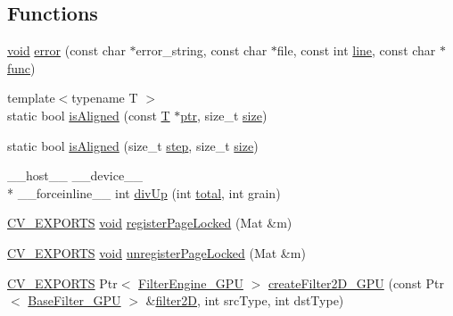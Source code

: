 \subsection*{Functions}
\begin{DoxyCompactItemize}
\item 
\hyperlink{legacy_8hpp_a8bb47f092d473522721002c86c13b94e}{void} \hyperlink{namespacecv_1_1gpu_a6fe205f2a3e57d7f6f2c4d7c07002405}{error} (const char $\ast$error\-\_\-string, const char $\ast$file, const int \hyperlink{legacy_8hpp_a5a869825573cfaf8861a6ec0fe0f262f}{line}, const char $\ast$\hyperlink{core__c_8h_a120677ac732b3c9bfecab149fc978afa}{func})
\item 
{\footnotesize template$<$typename T $>$ }\\static bool \hyperlink{namespacecv_1_1gpu_aa554e59e09e2e3a8f891b5b0a521b5ba}{is\-Aligned} (const \hyperlink{calib3d_8hpp_a3efb9551a871ddd0463079a808916717}{T} $\ast$\hyperlink{core__c_8h_a166529da793cc1ef241cff347f3db5a5}{ptr}, size\-\_\-t \hyperlink{legacy_8hpp_ae97003f8d5c64cdfb99f6f2606d121b6}{size})
\item 
static bool \hyperlink{namespacecv_1_1gpu_a6748cc1886c9b97dc92ff5059fa202e7}{is\-Aligned} (size\-\_\-t \hyperlink{legacy_8hpp_abc16e65f240ed0c8f3e876e8732c0a33}{step}, size\-\_\-t \hyperlink{legacy_8hpp_ae97003f8d5c64cdfb99f6f2606d121b6}{size})
\item 
\-\_\-\-\_\-host\-\_\-\-\_\- \-\_\-\-\_\-device\-\_\-\-\_\- \\*
\-\_\-\-\_\-forceinline\-\_\-\-\_\- int \hyperlink{namespacecv_1_1gpu_a7b80d0ece4df0b1f517b22422a3d272f}{div\-Up} (int \hyperlink{core__c_8h_a1d3d6f26038d24a66062d29e890a4301}{total}, int grain)
\item 
\hyperlink{core_2types__c_8h_a1bf9f0e121b54272da02379cfccd0a2b}{C\-V\-\_\-\-E\-X\-P\-O\-R\-T\-S} \hyperlink{legacy_8hpp_a8bb47f092d473522721002c86c13b94e}{void} \hyperlink{namespacecv_1_1gpu_a558eb0470ed87c78f8a0110b863c61a0}{register\-Page\-Locked} (Mat \&m)
\item 
\hyperlink{core_2types__c_8h_a1bf9f0e121b54272da02379cfccd0a2b}{C\-V\-\_\-\-E\-X\-P\-O\-R\-T\-S} \hyperlink{legacy_8hpp_a8bb47f092d473522721002c86c13b94e}{void} \hyperlink{namespacecv_1_1gpu_aa55a2e1497f0854b4a063f4a272055df}{unregister\-Page\-Locked} (Mat \&m)
\item 
\hyperlink{core_2types__c_8h_a1bf9f0e121b54272da02379cfccd0a2b}{C\-V\-\_\-\-E\-X\-P\-O\-R\-T\-S} Ptr$<$ \hyperlink{classcv_1_1gpu_1_1FilterEngine__GPU}{Filter\-Engine\-\_\-\-G\-P\-U} $>$ \hyperlink{namespacecv_1_1gpu_a69ab6da5fc06f6d80ce577ac5222837e}{create\-Filter2\-D\-\_\-\-G\-P\-U} (const Ptr$<$ \hyperlink{classcv_1_1gpu_1_1BaseFilter__GPU}{Base\-Filter\-\_\-\-G\-P\-U} $>$ \&\hyperlink{namespacecv_1_1gpu_ad0dd9de5d0cfcd09316f6377d356e689}{filter2\-D}, int src\-Type, int dst\-Type)

\end{DoxyCompactItemize}
